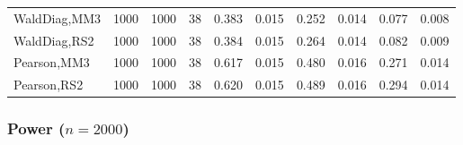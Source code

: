 \documentclass[
]{article}
\begin{document}
\begin{table}[H]
{\begin{tabular}[t]{lrrrrrrlrr}
\hspace{1em}WaldDiag,MM3 & 1000 & 1000 & 38 & 0.383 & 0.015 & 0.252 & 0.014 & 0.077 & 0.008\\
\hspace{1em}WaldDiag,RS2 & 1000 & 1000 & 38 & 0.384 & 0.015 & 0.264 & 0.014 & 0.082 & 0.009\\
\hspace{1em}Pearson,MM3 & 1000 & 1000 & 38 & 0.617 & 0.015 & 0.480 & 0.016 & 0.271 & 0.014\\
\hspace{1em}Pearson,RS2 & 1000 & 1000 & 38 & 0.620 & 0.015 & 0.489 & 0.016 & 0.294 & 0.014\\
\bottomrule
\end{tabular}}
\endgroup{}
\end{table}

\hypertarget{power-n2000-3}{%
\subsubsection{\texorpdfstring{Power
(\(n=2000\))}{Power (n=2000)}}\label{power-n2000-3}}
\end{document}
